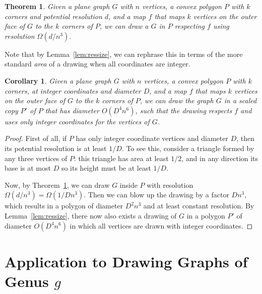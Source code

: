 \documentclass[11pt]{article}
\newtheorem {theorem} {Theorem}
\newtheorem {corollary} {Corollary}
\begin{document}
    \begin {theorem} \label {thm:fixeddrawing}
      Given a plane graph $G$ with $n$ vertices, a convex polygon $P$ with $k$ corners
      and potential resolution $d$,  and a map $f$ that maps $k$
      vertices on the outer face of $G$ to the $k$ corners of $P$,
      we can draw a $G$ in $P$ respecting $f$ using resolution $\Omega(d/n^3)$.
    \end {theorem}

    Note that by Lemma~\ref {lem:ressize}, we can rephrase this in terms of the
    more standard \emph {area} of a drawing when all coordinates are integer.

    \begin {corollary}
      Given a plane graph $G$ with $n$ vertices, a convex polygon $P$ with $k$ corners,
      at integer coordinates and diameter $D$, and a map $f$ that maps $k$
      vertices on the outer face of $G$ to the $k$ corners of $P$,
      we can draw the graph $G$ in a scaled copy $P'$ of $P$ that has diameter $O (D^4n^6)$, such that the drawing 
      respects $f$ and uses only integer coordinates for the vertices of $G$.
\end {corollary}

    \begin {proof}
      First of all, if $P$ has only integer coordinate vertices and diameter $D$,
      then its potential resolution is at least $1/D$. To see this, consider
      a triangle formed by any three vertices of $P$: this triangle has area at
      least $1/2$, and in any direction its base is at most $D$ so its height
      must be at least $1/D$.

      Now, by Theorem~\ref {thm:fixeddrawing}, we can draw $G$ inside $P$ with
      resolution $\Omega(d/n^3) = \Omega (1/Dn^3)$. Then we can blow up the drawing by
      a factor $Dn^3$, which results in a polygon of diameter $D^2n^3$
      and at least constant resolution. By Lemma~\ref {lem:ressize}, there now also
      exists a drawing of $G$ in a polygon $P'$ of diameter $O (D^4n^6)$
      in which all vertices are drawn with integer coordinates.
    \end {proof}


\section {Application to Drawing Graphs of Genus $g$}
\end{document}
